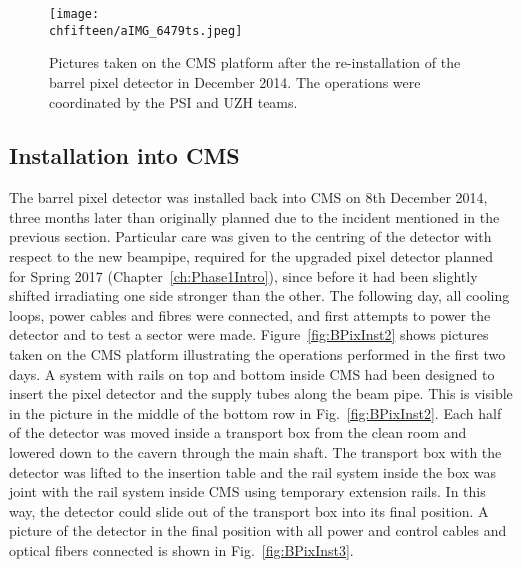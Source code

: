 \begin{figure}[!htb]
 \begin{center}
 \texttt{[image: \\chfifteen/aIMG\_6479ts.jpeg]}
 \end{center}
 \caption{Pictures taken on the CMS platform after the re-installation of the barrel pixel detector in December 2014. The operations were coordinated by the PSI and UZH teams.}
 \label{fig:BPixInst}
\end{figure}

\subsection{Installation into CMS}\label{sec:BPixInst}

The barrel pixel detector was installed back into CMS on 8th December 2014, three months later than originally planned due to the incident mentioned in the previous section. 
Particular care was given to the centring of the detector with respect to the new beampipe, required for the upgraded pixel detector planned for Spring 2017 (Chapter~\ref{ch:Phase1Intro}),
since before it had been slightly shifted irradiating one side stronger than the other.
The following day, all cooling loops, power cables and fibres were connected, and first attempts to power the detector and to test a sector were made.
Figure~\ref{fig:BPixInst2} shows pictures taken on the CMS platform illustrating the operations performed in the first two days.
A system with rails on top and bottom inside CMS had been designed to insert the pixel detector and the supply tubes along the beam pipe.
This is visible in the picture in the middle of the bottom row in Fig.~\ref{fig:BPixInst2}.
Each half of the detector was moved inside a transport box from the clean room and lowered down to the cavern through the main shaft.
The transport box with the detector was lifted to the insertion table and the rail system inside the box was joint with the rail system inside CMS using temporary extension rails.
In this way, the detector could slide out of the transport box into its final position.
A picture of the detector in the final position with all power and control cables and optical fibers connected is shown in Fig.~\ref{fig:BPixInst3}.

